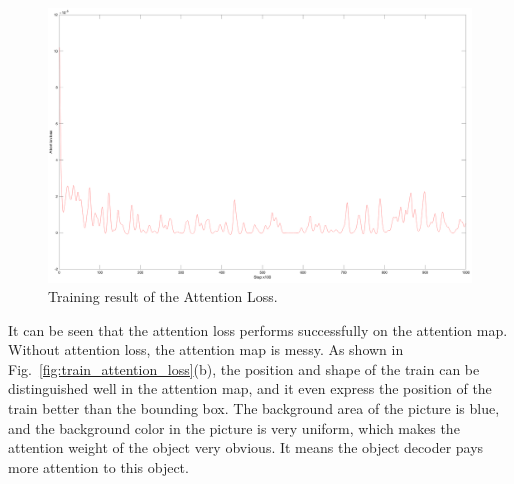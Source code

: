\begin{figure}[H]
	\centering
	\includegraphics[width=0.7\linewidth]{figures/result/attention_loss}
	\caption[Training result of the Attention Loss]{Training result of the Attention Loss.}
	\label{fig:attention_loss_result}
\end{figure}

It can be seen that the attention loss performs successfully on the attention map. Without attention loss, the attention map is messy. As shown in Fig.~\ref{fig:train_attention_loss}(b), the position and shape of the train can be distinguished well in the attention map, and it even express the position of the train better than the bounding box. The background area of the picture is blue, and the background color in the picture is very uniform, which makes the attention weight of the object very obvious. It means the object decoder pays more attention to this object.

